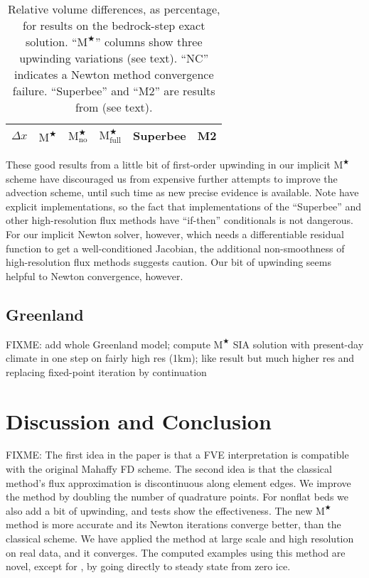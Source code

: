 \documentclass[twocolumn,letterpaper]{igs}
\newcommand{\Mstar}{$\text{M}^{\bigstar}$\xspace}
\newcommand{\Mstarnoup}{$\text{M}^{\bigstar}_{\text{no}}$\xspace}
\newcommand{\Mstarfullup}{$\text{M}^{\bigstar}_{\text{full}}$\xspace}
\begin{document}
\begin{table}[ht]
  \caption{Relative volume differences, as percentage, for results on the \cite{JaroschSchoofAnslow2013} bedrock-step exact solution.  ``\Mstar'' columns show three upwinding variations (see text).  ``NC'' indicates a Newton method convergence failure.  ``Superbee'' and ``M2'' are results from \cite{JaroschSchoofAnslow2013} (see text).}
  \vskip4mm \centering
  \begin{tabular}{lccccc}
    $\Delta x$ & \Mstar & \Mstarnoup & \Mstarfullup & Superbee & M2 \\  \hline

  \end{tabular}
  \label{tab:bedstepvol}
\end{table}

These good results from a little bit of first-order upwinding in our implicit \Mstar scheme have discouraged us from expensive further attempts to improve the advection scheme, until such time as new precise evidence is available.  Note \cite{JaroschSchoofAnslow2013} have explicit implementations, so the fact that implementations of the ``Superbee'' and other high-resolution flux methods have ``if-then'' conditionals \citep{LeVeque2002} is not dangerous.  For our implicit Newton solver, however, which needs a differentiable residual function to get a well-conditioned Jacobian, the additional non-smoothness of high-resolution flux methods suggests caution.  Our bit of upwinding seems helpful to Newton convergence, however.


\subsection{Greenland}

FIXME: add whole Greenland model; compute \Mstar SIA solution with present-day climate in one step on fairly high res (1km); like \cite{JouvetBueler2012} result but much higher res and replacing fixed-point iteration by continuation 


\section{Discussion and Conclusion} \label{sec:conclusion}

FIXME: The first idea in the paper is that a FVE interpretation is compatible with the original Mahaffy FD scheme.  The second idea is that the classical method's flux approximation is discontinuous along element edges.  We improve the method by doubling the number of quadrature points.  For nonflat beds we also add a bit of upwinding, and tests show the effectiveness.  The new \Mstar method is more accurate and its Newton iterations converge better, than the classical scheme.  We have applied the method at large scale and high resolution on real data, and it converges.  The computed examples using this method are novel, except for \cite{JouvetBueler2012}, by going directly to steady state from zero ice.
\end{document}
